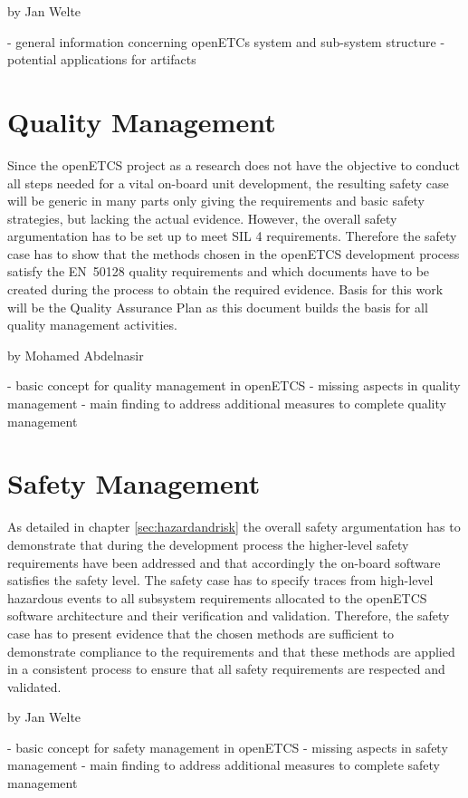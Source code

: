 \documentclass{template/openetcs_report}
\begin{document}
by Jan Welte

- general information concerning openETCs system and sub-system structure
- potential applications for artifacts

\section{Quality Management}

Since the openETCS project as a research does not have the objective to conduct all steps needed for a vital on-board unit development, the resulting safety case will be generic in many parts only giving the requirements and basic safety strategies, but lacking the actual evidence. However, the overall safety argumentation has to be set up to meet SIL 4 requirements. Therefore the safety case has to show that the methods chosen in the openETCS development process satisfy the EN~50128 quality requirements and which documents have to be created during the process to obtain the required evidence. Basis for this work will be the Quality Assurance Plan as this document builds the basis for all quality management activities.

by Mohamed Abdelnasir

- basic concept for quality management in openETCS
- missing aspects in quality management
- main finding to address additional measures to complete quality management

\section{Safety Management}

As detailed in chapter \ref{sec:hazardandrisk} the overall safety argumentation has to demonstrate that during the development process the higher-level safety requirements have been addressed and that accordingly the on-board software satisfies the safety level. The safety case has to specify traces from high-level hazardous events to all subsystem requirements allocated to the openETCS software architecture and their verification and validation. Therefore, the safety case has to present evidence that the chosen methods are sufficient to demonstrate compliance to the requirements and that these methods are applied in a consistent process to ensure that all safety requirements are respected and validated.


by Jan Welte

- basic concept for safety management in openETCS
- missing aspects in safety management
- main finding to address additional measures to complete safety management
\end{document}
